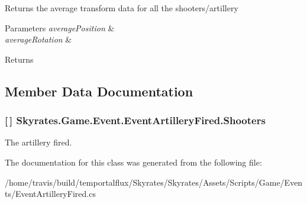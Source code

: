 Returns the average transform data for all the shooters/artillery 


\begin{DoxyParams}{Parameters}
{\em average\-Position} & \\
\hline
{\em average\-Rotation} & \\
\hline
\end{DoxyParams}
\begin{DoxyReturn}{Returns}

\end{DoxyReturn}


\subsection{Member Data Documentation}
\hypertarget{class_skyrates_1_1_game_1_1_event_1_1_event_artillery_fired_aa8e0ceed9eba663757f2b9d4487108c1}{
\subsubsection[{Shooters}]{ \mbox{[}$\,$\mbox{]} Skyrates.\-Game.\-Event.\-Event\-Artillery\-Fired.\-Shooters}}\label{class_skyrates_1_1_game_1_1_event_1_1_event_artillery_fired_aa8e0ceed9eba663757f2b9d4487108c1}


The artillery fired. 



The documentation for this class was generated from the following file\-:\begin{DoxyCompactItemize}
\item 
/home/travis/build/temportalflux/\-Skyrates/\-Skyrates/\-Assets/\-Scripts/\-Game/\-Events/Event\-Artillery\-Fired.\-cs\end{DoxyCompactItemize}

